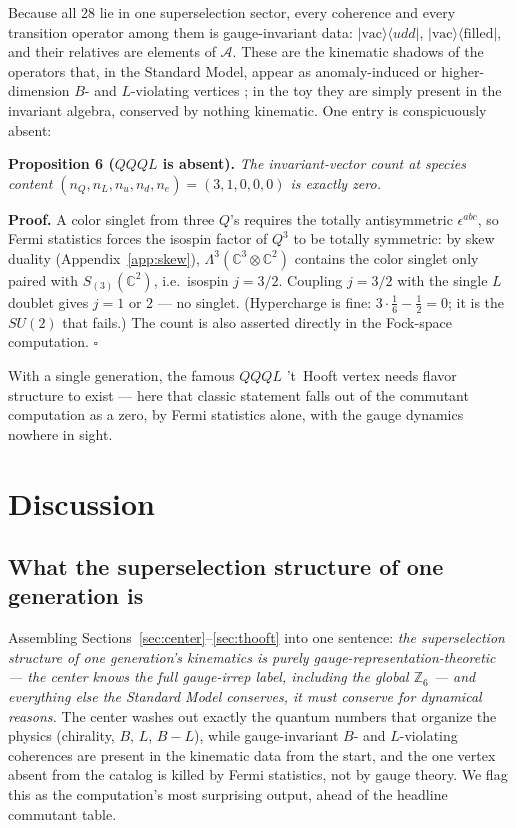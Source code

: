 \documentclass[11pt]{article}
\newcommand{\CC}{\mathbb{C}}
\newcommand{\ZZ}{\mathbb{Z}}
\newcommand{\Alg}{\mathcal{A}}
\begin{document}
Because all 28 lie in one superselection sector, every coherence and every transition operator among them is gauge-invariant data: $|\mathrm{vac}\rangle\langle udd|$, $|\mathrm{vac}\rangle\langle\mathrm{filled}|$, and their relatives are elements of $\Alg$. These are the kinematic shadows of the operators that, in the Standard Model, appear as anomaly-induced or higher-dimension $B$- and $L$-violating vertices \cite{thooft}; in the toy they are simply present in the invariant algebra, conserved by nothing kinematic. One entry is conspicuously absent:

\medskip

{\sloppy\noindent\textbf{Proposition 6 ($QQQL$ is absent).} \emph{The invariant-vector count at species content $(n_Q,n_L,n_u,n_d,n_e) = (3,1,0,0,0)$ is exactly zero.}\par}

\medskip

\noindent\textbf{Proof.} A color singlet from three $Q$'s requires the totally antisymmetric $\epsilon^{abc}$, so Fermi statistics forces the isospin factor of $Q^3$ to be totally symmetric: by skew duality (Appendix~\ref{app:skew}), $\Lambda^3(\CC^3\otimes\CC^2)$ contains the color singlet only paired with $S_{(3)}(\CC^2)$, i.e.\ isospin $j = 3/2$. Coupling $j=3/2$ with the single $L$ doublet gives $j = 1$ or $2$ --- no singlet. (Hypercharge is fine: $3\cdot\frac16 - \frac12 = 0$; it is the $SU(2)$ that fails.) The count is also asserted directly in the Fock-space computation. \hfill$\square$

\medskip

With a single generation, the famous $QQQL$ 't~Hooft vertex needs flavor structure to exist --- here that classic statement falls out of the commutant computation as a zero, by Fermi statistics alone, with the gauge dynamics nowhere in sight.

\section{Discussion}\label{sec:discussion}

\subsection{What the superselection structure of one generation is}

Assembling Sections~\ref{sec:center}--\ref{sec:thooft} into one sentence: \emph{the superselection structure of one generation's kinematics is purely gauge-representation-theoretic --- the center knows the full gauge-irrep label, including the global $\ZZ_6$ --- and everything else the Standard Model conserves, it must conserve for dynamical reasons.} The center washes out exactly the quantum numbers that organize the physics (chirality, $B$, $L$, $B-L$), while gauge-invariant $B$- and $L$-violating coherences are present in the kinematic data from the start, and the one vertex absent from the catalog is killed by Fermi statistics, not by gauge theory. We flag this as the computation's most surprising output, ahead of the headline commutant table.
\end{document}
